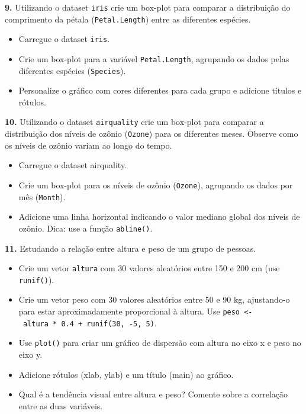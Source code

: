 \documentclass[
]{book}
\providecommand{\tightlist}{%
  \setlength{\itemsep}{0pt}\setlength{\parskip}{0pt}}
\begin{document}
\textbf{9.} Utilizando o dataset \texttt{iris} crie um box-plot para comparar a
distribuição do comprimento da pétala (\texttt{Petal.Length}) entre as
diferentes espécies.

\begin{itemize}
\item
  Carregue o dataset \texttt{iris}.
\item
  Crie um box-plot para a variável \texttt{Petal.Length}, agrupando os dados
  pelas diferentes espécies (\texttt{Species}).
\item
  Personalize o gráfico com cores diferentes para cada grupo e
  adicione títulos e rótulos.
\end{itemize}

\textbf{10.} Utilizando o dataset \texttt{airquality} crie um box-plot para comparar
a distribuição dos níveis de ozônio (\texttt{Ozone}) para os diferentes meses.
Observe como os níveis de ozônio variam ao longo do tempo.

\begin{itemize}
\item
  Carregue o dataset airquality.
\item
  Crie um box-plot para os níveis de ozônio (\texttt{Ozone}), agrupando os
  dados por mês (\texttt{Month}).
\item
  Adicione uma linha horizontal indicando o valor mediano global dos
  níveis de ozônio. Dica: use a função \texttt{abline()}.
\end{itemize}

\textbf{11.} Estudando a relação entre altura e peso de um grupo de pessoas.

\begin{itemize}
\tightlist
\item
  Crie um vetor \texttt{altura} com 30 valores aleatórios entre 150 e 200 cm (use \texttt{runif()}).
\item
  Crie um vetor peso com 30 valores aleatórios entre 50 e 90 kg, ajustando-o para estar aproximadamente proporcional à altura. Use \texttt{peso\ \textless{}-\ altura\ *\ 0.4\ +\ runif(30,\ -5,\ 5)}.
\item
  Use \texttt{plot()} para criar um gráfico de dispersão com altura no eixo x e peso no eixo y.
\item
  Adicione rótulos (xlab, ylab) e um título (main) ao gráfico.
\item
  Qual é a tendência visual entre altura e peso? Comente sobre a correlação entre as duas variáveis.
\end{itemize}
\end{document}
